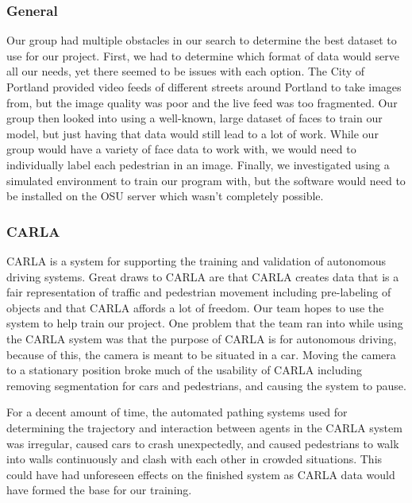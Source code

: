 \documentclass[onecolumn, draftclsnofoot,10pt, compsoc]{IEEEtran}
\begin{document}
\subsubsection{General}
Our group had multiple obstacles in our search to determine the best dataset to use for our project. First, we had to determine which format of data would serve all our needs, yet there seemed to be issues with each option. The City of Portland provided video feeds of different streets around Portland to take images from, but the image quality was poor and the live feed was too fragmented. Our group then looked into using a well-known, large dataset of faces to train our model, but just having that data would still lead to a lot of work. While our group would have a variety of face data to work with, we would need to individually label each pedestrian in an image. Finally, we investigated using a simulated environment to train our program with, but the software would need to be installed on the OSU server which wasn't completely possible. 

\subsubsection{CARLA}
CARLA is a system for supporting the training and validation of  autonomous driving systems. Great draws to CARLA are that CARLA creates data that is a fair representation of traffic and pedestrian movement including pre-labeling of objects and that CARLA affords a lot of freedom. Our team hopes to use the system to help train our project.
One problem that the team ran into while using the CARLA system was that the purpose of CARLA is for autonomous driving, because of this, the camera is meant to be situated in a car. Moving the camera to a stationary position broke much of the usability of CARLA including removing segmentation for cars and pedestrians, and causing the system to pause. 

For a decent amount of time, the automated pathing systems used for determining the trajectory and interaction between agents in the CARLA system was irregular, caused cars to crash unexpectedly, and caused pedestrians to walk into walls continuously and clash with each other in crowded situations. This could have had unforeseen effects on the finished system as CARLA data would have formed the base for our training.
\end{document}

